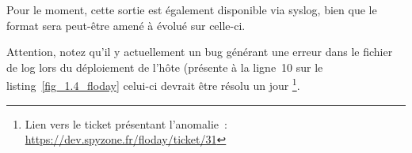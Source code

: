 Pour le moment, cette sortie est également disponible via syslog, bien que le format sera peut-être amené à évolué sur celle-ci.

Attention, notez qu'il y actuellement un bug générant une erreur dans le fichier de log lors du déploiement de l'hôte (présente à la ligne~10 sur le listing~\ref{fig_1.4_floday} celui-ci devrait être résolu un jour%
\footnote{Lien vers le ticket présentant l'anomalie~: \url{https://dev.spyzone.fr/floday/ticket/31}}.
